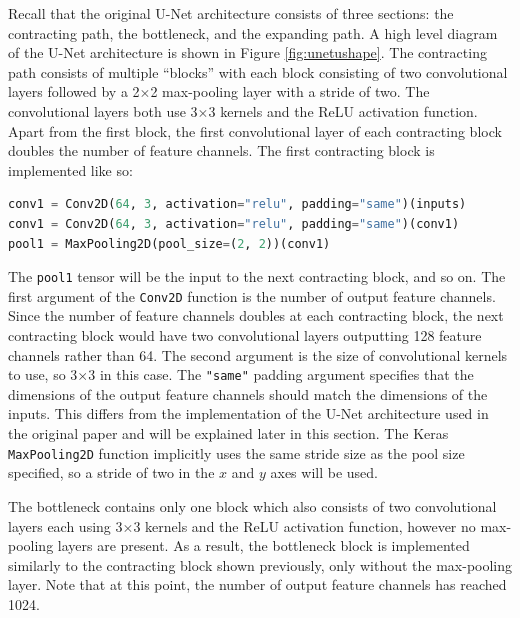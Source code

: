 Recall that the original U-Net architecture consists of three sections: the contracting path, the bottleneck, and the expanding path. A high level diagram of the U-Net architecture is shown in Figure \ref{fig:unetushape}. The contracting path consists of multiple ``blocks'' with each block consisting of two convolutional layers followed by a 2$\times$2 max-pooling layer with a stride of two. The convolutional layers both use 3$\times$3 kernels and the ReLU activation function. Apart from the first block, the first convolutional layer of each contracting block doubles the number of feature channels. The first contracting block is implemented like so:
\begin{lstlisting}[language=Python,upquote=true,belowskip=0pt]
conv1 = Conv2D(64, 3, activation="relu", padding="same")(inputs)
conv1 = Conv2D(64, 3, activation="relu", padding="same")(conv1)
pool1 = MaxPooling2D(pool_size=(2, 2))(conv1)
\end{lstlisting}
The \texttt{pool1} tensor will be the input to the next contracting block, and so on. The first argument of the \texttt{Conv2D} function is the number of output feature channels. Since the number of feature channels doubles at each contracting block, the next contracting block would have two convolutional layers outputting 128 feature channels rather than 64. The second argument is the size of convolutional kernels to use, so 3$\times$3 in this case. The \texttt{"{}same"{}} padding argument specifies that the dimensions of the output feature channels should match the dimensions of the inputs. This differs from the implementation of the U-Net architecture used in the original paper and will be explained later in this section. The Keras \texttt{MaxPooling2D} function implicitly uses the same stride size as the pool size specified, so a stride of two in the $x$ and $y$ axes will be used.

The bottleneck contains only one block which also consists of two convolutional layers each using 3$\times$3 kernels and the ReLU activation function, however no max-pooling layers are present. As a result, the bottleneck block is implemented similarly to the contracting block shown previously, only without the max-pooling layer. Note that at this point, the number of output feature channels has reached 1024.

